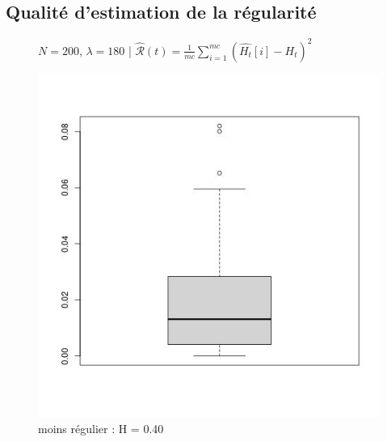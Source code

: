 \subsection{Qualité d'estimation de la régularité}

\begin{figure}[H]
	\centering
	$N = 200$, $\lambda = 180$ | $\widehat{\mathcal R}(t) = \frac 1 {mc} \sum\limits_{i=1}^{mc} (\widehat{H_t}[i] - H_t)^2$

	\centering
	\noindent\begin{minipage}{0.32\linewidth}
		\centering
		\includegraphics[width=\textwidth]{Images/regularite_qualite_estimation/N200_lbd180_box3_2.jpg}
		moins régulier : H = 0.40
	\end{minipage}
	\begin{minipage}{0.32\linewidth}
		\centering

\end{minipage}
\end{figure}
